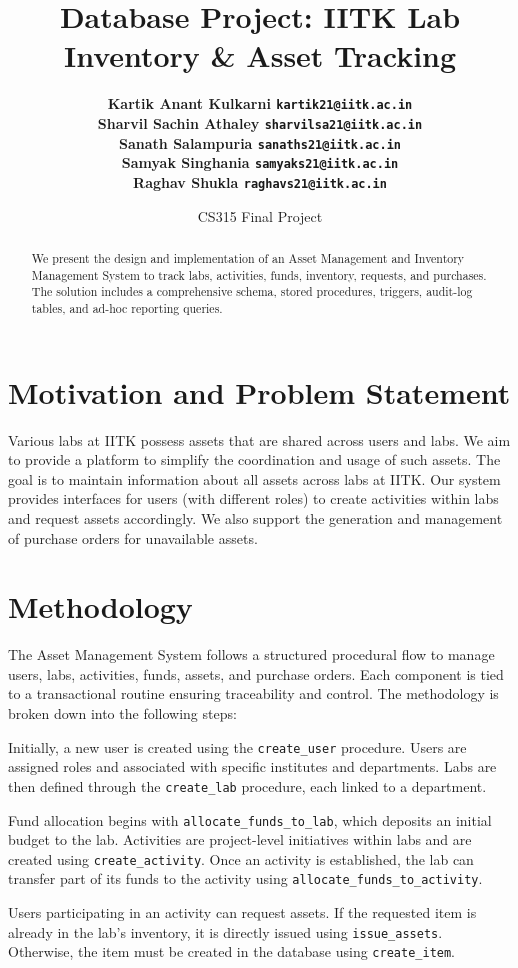 \documentclass[11pt]{article}
\title{\bf Database Project: IITK Lab Inventory \& Asset Tracking}
\author{
  \bf Kartik Anant Kulkarni \qquad 210493 \qquad \texttt{kartik21@iitk.ac.in} \\
  \bf Sharvil Sachin Athaley \qquad 210961 \qquad \texttt{sharvilsa21@iitk.ac.in} \\
  \bf Sanath Salampuria \qquad 210919 \qquad \texttt{sanaths21@iitk.ac.in} \\
  \bf Samyak Singhania \qquad 210917 \qquad \texttt{samyaks21@iitk.ac.in} \\
  \bf Raghav Shukla \qquad 210800 \qquad \texttt{raghavs21@iitk.ac.in}
}
\date{CS315 Final Project}
\begin{document}
\maketitle

\begin{abstract}
We present the design and implementation of an Asset Management and Inventory Management System to track labs, activities, funds, inventory, requests, and purchases. The solution includes a comprehensive schema, stored procedures, triggers, audit-log tables, and ad-hoc reporting queries.
\end{abstract}

\section{Motivation and Problem Statement}
Various labs at IITK possess assets that are shared across users and labs. We aim to provide a platform to simplify the coordination and usage of such assets. The goal is to maintain information about all assets across labs at IITK. Our system provides interfaces for users (with different roles) to create activities within labs and request assets accordingly. We also support the generation and management of purchase orders for unavailable assets.

\section{Methodology}

The Asset Management System follows a structured procedural flow to manage users, labs, activities, funds, assets, and purchase orders. Each component is tied to a transactional routine ensuring traceability and control. The methodology is broken down into the following steps:

Initially, a new user is created using the \texttt{create\_user} procedure. Users are assigned roles and associated with specific institutes and departments. Labs are then defined through the \texttt{create\_lab} procedure, each linked to a department.

Fund allocation begins with \texttt{allocate\_funds\_to\_lab}, which deposits an initial budget to the lab. Activities are project-level initiatives within labs and are created using \texttt{create\_activity}. Once an activity is established, the lab can transfer part of its funds to the activity using \texttt{allocate\_funds\_to\_activity}.

Users participating in an activity can request assets. If the requested item is already in the lab's inventory, it is directly issued using \texttt{issue\_assets}. Otherwise, the item must be created in the database using \texttt{create\_item}.
\end{document}
